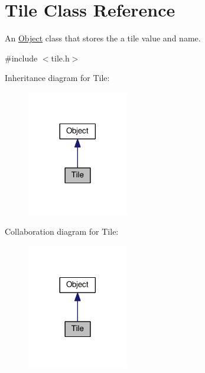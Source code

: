 \hypertarget{classTile}{}\section{Tile Class Reference}
\label{classTile}


An \hyperlink{classObject}{Object} class that stores the a tile value and name.  




{\ttfamily \#include $<$tile.\+h$>$}



Inheritance diagram for Tile\+:
\nopagebreak
\begin{figure}[H]
\begin{center}
\leavevmode
\includegraphics[width=125pt]{classTile__inherit__graph}
\end{center}
\end{figure}


Collaboration diagram for Tile\+:
\nopagebreak
\begin{figure}[H]
\begin{center}
\leavevmode
\includegraphics[width=125pt]{classTile__coll__graph}
\end{center}
\end{figure}
